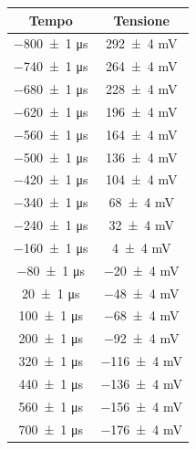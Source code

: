 \documentclass[a4paper]{article}
\begin{document}
\begin{appendices}
\begin{table}[htbp]
    \centering
    \begin{minipage}{0.48\textwidth}
        \centering\small %
        \begin{tabular}{|c|c|}
        \hline
        Tempo & Tensione \\\hline\hline
        \num{-800 \pm 1} \si{\micro\second} & \num{292 \pm 4} \si{\milli\volt} \\
        \num{-740 \pm 1} \si{\micro\second} & \num{264 \pm 4} \si{\milli\volt} \\
        \num{-680 \pm 1} \si{\micro\second} & \num{228 \pm 4} \si{\milli\volt} \\
        \num{-620 \pm 1} \si{\micro\second} & \num{196 \pm 4} \si{\milli\volt} \\
        \num{-560 \pm 1} \si{\micro\second} & \num{164 \pm 4} \si{\milli\volt} \\
        \num{-500 \pm 1} \si{\micro\second} & \num{136 \pm 4} \si{\milli\volt} \\
        \num{-420 \pm 1} \si{\micro\second} & \num{104 \pm 4} \si{\milli\volt} \\
        \num{-340 \pm 1} \si{\micro\second} & \num{68 \pm 4} \si{\milli\volt} \\
        \num{-240 \pm 1} \si{\micro\second} & \num{32 \pm 4} \si{\milli\volt} \\
        \num{-160 \pm 1} \si{\micro\second} & \num{4 \pm 4} \si{\milli\volt} \\
        \num{-80 \pm 1} \si{\micro\second} & \num{-20 \pm 4} \si{\milli\volt} \\
        \num{20 \pm 1} \si{\micro\second} & \num{-48 \pm 4} \si{\milli\volt} \\
        \num{100 \pm 1} \si{\micro\second} & \num{-68 \pm 4} \si{\milli\volt} \\
        \num{200 \pm 1} \si{\micro\second} & \num{-92 \pm 4} \si{\milli\volt} \\
        \num{320 \pm 1} \si{\micro\second} & \num{-116 \pm 4} \si{\milli\volt} \\
        \num{440 \pm 1} \si{\micro\second} & \num{-136 \pm 4} \si{\milli\volt} \\
        \num{560 \pm 1} \si{\micro\second} & \num{-156 \pm 4} \si{\milli\volt} \\
        \num{700 \pm 1} \si{\micro\second} & \num{-176 \pm 4} \si{\milli\volt} \\

\end{tabular}
\end{minipage}
\end{table}
\end{appendices}
\end{document}
